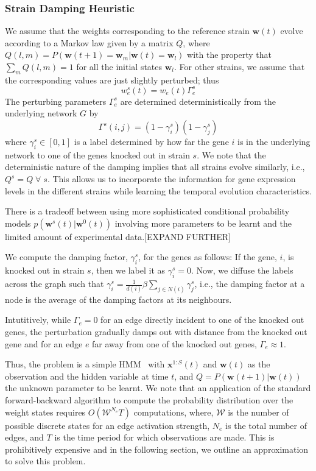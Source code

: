 \documentclass{bioinfo}
\begin{document}
\begin{methods}
\subsubsection{Strain Damping Heuristic } 
We assume that the weights corresponding to the reference strain
$\mathbf{w}(t)$ evolve according to a Markov law given by a matrix $Q$,
where $Q(l, m) = P(\mathbf{w}(t+1) = \mathbf{w}_{m} | {\mathbf w}(t)
= \mathbf{w}_{l})$ with the property that $\sum_{m} Q(l, m) = 1$ for
all the initial states $\mathbf{w}_{l}$. For other strains, we assume
that the corresponding values are just slightly perturbed; thus
\begin{equation}
  \label{eq:damping}
 w^s_e(t) = w_e(t) \Gamma^s_e
\end{equation}
The perturbing parameters $\Gamma^s_e$ are determined
deterministically from the underlying network $G$ by
\begin{equation}
  \label{eq:edge-damping}
\Gamma^s(i,j) = (1 - \gamma^s_i)(1 - \gamma^s_j)  
\end{equation}
where $\gamma^s_i \in [0,1]$ is a label determined by how far the gene
$i$ is in the underlying network to one of the genes knocked out in
strain $s$. We note that the deterministic nature of the damping
implies that all strains evolve similarly, i.e., $Q^{s} = Q\;
\forall \; s$. This allows us to incorporate the information for gene
expression levels in the different strains while learning the temporal
evolution characteristics. 

There is a tradeoff between using more sophisticated conditional
probability models $p(\mathbf{w}^{s}(t) |\mathbf{w}^{0}(t))$ involving more
parameters to be learnt and the limited amount of experimental
data.[EXPAND FURTHER] 

We compute the damping factor, $\gamma^s_i$, for the genes
as follows: If the gene, $i$, is knocked out in strain $s$, then we
label it as $\gamma^s_i=0$. Now, we diffuse the labels across the
graph  such that $\gamma^{s}_i = \frac{1}{d(i)} \beta
\sum_{j\in N(i)} \gamma_j^s$, i.e., the damping factor at a node is
the average of the damping factors at its neighbours.    

 Intutitively, while $\Gamma_e = 0$ for an edge 
directly incident to one of the knocked out genes, the perturbation
gradually damps out with distance from the knocked out gene and for
an edge $e$ far away from one of the knocked out genes, $\Gamma_e
\approx 1$.

Thus, the problem is a simple HMM~\cite{Rabiner89hmm} with
$\mathbf{x}^{1:S}(t)$ and $\mathbf{w}(t)$ as the observation and  the
hidden variable at time $t$, and $Q=P(\mathbf{w}(t+1)| \mathbf{w}(t))$
the unknown parameter to be learnt. 
We note that an application of the standard forward-backward algorithm
to compute the probability distribution over the weight states
requires $O({\mathcal W}^{N_{e}}T)$ computations, where, ${\mathcal
  W}$ is the number of possible discrete states for an edge activation
strength, $N_{e}$ is the total number of edges, and $T$ is the time
period for which observations are made.  This is prohibitively
expensive and in the following section, we outline an approximation to
solve this problem.


\end{methods}
\end{document}
